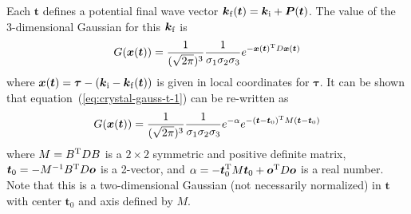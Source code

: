 Each $\boldsymbol{t}$ defines a potential final wave vector
$\boldsymbol{k}_{\rm f}(\boldsymbol{t}) = \boldsymbol{k}_{\rm i} +
\boldsymbol{P}(\boldsymbol{t})$. The value of the 3-dimensional Gaussian
for this $\boldsymbol{k}_{\rm f}$ is
\begin{equation}
  \label{eq:crystal-gauss-t-1}
  G(\boldsymbol{x}(\boldsymbol{t})) =
  \frac{1}{(\sqrt{2\pi})^3}\frac{1}{\sigma_1\sigma_2\sigma_3}
  e^{-\boldsymbol{x}(\boldsymbol{t})^{\rm T} D \boldsymbol{x}(\boldsymbol{t})}
\end{equation}
where $\boldsymbol{x}(\boldsymbol{t}) = \boldsymbol{\tau} -
(\boldsymbol{k}_{\rm i} - \boldsymbol{k}_{\rm f}(\boldsymbol{t}))$ is
given in local coordinates for $\boldsymbol{\tau}$. It can be shown that
equation~(\ref{eq:crystal-gauss-t-1}) can be re-written as
\begin{equation}
  \label{eq:crystal-gauss-2}
  G(\boldsymbol{x}(\boldsymbol{t})) =
  \frac{1}{(\sqrt{2\pi})^3}\frac{1}{\sigma_1\sigma_2\sigma_3} e^{-\alpha}
  e^{-(\boldsymbol{t}-\boldsymbol{t}_0)^{\rm T} M
    (\boldsymbol{t}-\boldsymbol{t}_0)}
\end{equation}
where $M = B^{\rm T} D B$ is a $2 \times 2$ symmetric and positive
definite matrix, $\boldsymbol{t}_0 = -M^{-1}B^{\rm T} D \boldsymbol{o}$
is a 2-vector, and $\alpha = -\boldsymbol{t}_0^{\rm T} M
\boldsymbol{t}_0 + \boldsymbol{o}^{\rm T} D \boldsymbol{o}$ is a real
number.  Note that this is a two-dimensional Gaussian (not necessarily
normalized) in $\boldsymbol{t}$ with center $\boldsymbol{t}_0$ and axis
defined by $M$.

